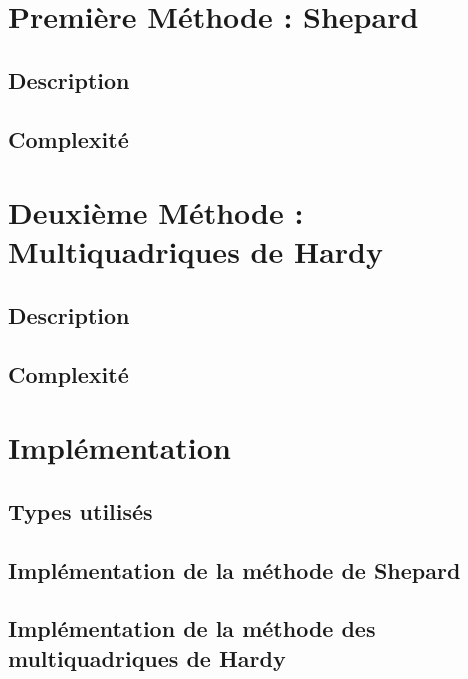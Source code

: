 \documentclass[a4paper,9pt]{article}
\begin{document}
\section{Première Méthode : Shepard}
\label{sec:shepard}

\subsection{Description}
\label{subsec:shepard_description}

\subsection{Complexité}
\label{subsec:shepard_complexite}

\section{Deuxième Méthode : Multiquadriques de Hardy}
\label{sec:hardy}

\subsection{Description}
\label{subsec:hardy_description}

\subsection{Complexité}
\label{subsec:hardy_complexite}

\section{Implémentation}
\label{sec:implementation}

\subsection{Types utilisés}
\label{subsec:types}

\subsection{Implémentation de la méthode de Shepard}
\label{subsec:shepard_implementation}

\subsection{Implémentation de la méthode des multiquadriques de Hardy}
\label{subsec:hardy_implementation}
\end{document}
